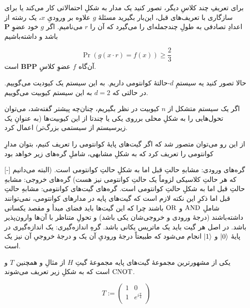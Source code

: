 برای تعریفِ چند کلاسِ دیگر، تصور کنید یک مدار به شکلِ احتمالاتی کار می‌کند یا برای سازگاری با تعریف‌های قبل، این‌بار بگیرید مسئلهٔ \(g\) علاوه بر ورودیِ \(x\)، یک رشته از اعدادِ تصادفی به طولِ چندجمله‌ای را می‌گیرد که آن را \(r\) می‌نامیم. اگر \(g\) خود عضوِ 
\( \mathbf{P} \) 
باشد و داشته‌باشیم

\begin{equation}
    \Pr(g(x \cdot r) = f(x)) \ge \frac{2}{3}
\end{equation} 
آن‌گاه \(f\) عضوِ کلاسِ 
\( \mathbf{BPP} \)
است. 
 
 
حالا تصور کنید یه سیستمِ \(d\)-حالتهٔ 
کوانتومی داریم. به این سیستم یک کیودیت می‌گوییم. در حالتی که 
\(d=2\)
به این سیستم کیوبیت می‌گوییم.

اگر یک سیستم متشکل از \(n\) کیوبیت در نظر بگیریم، چنان‌چه پیشتر گفته‌شد، می‌توان تحول‌هایی را به شکلِ محلی برروی یکی یا چندتا از این کیوبیت‌ها (به عنوانِ یک زیرسیستم از سیستمی بزرگ‌تر) اعمال کرد.

از این رو می‌توان متصور شد که اگر گیت‌های پایهٔ کوانتومی را تعریف کنیم، بتوان مدارِ کوانتومی را تعریف کرد که به شکلِ مشابهی، شاملِ گره‌های زیر خواهد بود 

[-]
 گره‌های ورودی: مشابهِ حالتِ قبل اما به شکلِ حالتِ کوانتومی است. (البته می‌دانیم که هر حالتِ کلاسیکی لزوماً یک حالتِ کوانتومی نیز هست)
 گره‌های خروجی: مشابهِ حالتِ قبل اما به شکلِ حالتِ کوانتومی است.
 گره‌های گیت‌های کوانتومی: مشابهِ حالتِ قبل اما ذکرِ این نکته لازم است که گیت‌های پایه در مدارهای کوانتومی، نمی‌توانند شاملِ
\(\operatorname{AND}\)
و
\(\operatorname{OR}\)
باشند چرا که این گیت‌ها باید فضای مبدأ و مقصد یکسانی داشته‌باشند (درجهٔ ورودی و خروجی‌شان یکی باشد) و تحولِ متناظر با آن‌ها وارون‌پذیر باشد. در اصل هر گیت باید یک ماتریس یکانی باشد.
 گرهِ اندازه‌گیری: یک اندازه‌گیری در پایهٔ 
\( \ket{0} \)
و 
\( \ket{1} \)
انجام می‌شود که طبیعتاً درجهٔ ورودیِ آن یک و درجهٔ خروجیِ آن نیز یک است.


یکی از مشهورترین مجموعهٔ گیت‌های پایه مجموعهٔ گیتِ \(H\) از مثالِ  و همچنین \(T\) و \(\operatorname{CNOT}\)
است که به شکلِ زیر تعریف می‌شوند. 

\begin{equation}
    T := \begin{pmatrix}
        1 & 0 \\
        1 & e^{i\frac{\pi}{4}} \\
    \end{pmatrix}
\end{equation}


